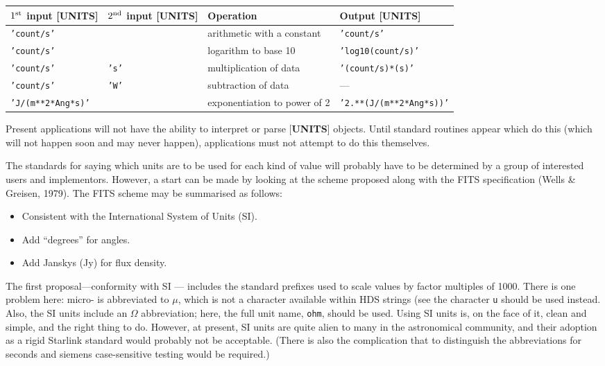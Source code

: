 \documentclass[twoside,11pt,nolof,noabs]{starlink}
\begin{document}
\smallskip
\begin{center}
\begin{tabular}{llll}
$1^{\rm st}$ input {[}\textbf{UNITS}{]} & $2^{\rm nd}$ input {[}\textbf{UNITS}{]} &
Operation & Output {[}\textbf{UNITS}{]} \\ \hline
\texttt{'count/s'} & & arithmetic with a constant & \texttt{'count/s'} \\
\texttt{'count/s'} & & logarithm to base 10 & \texttt{'log10(count/s)'} \\
\texttt{'count/s'} & \texttt{'s'} & multiplication of data & \texttt{'(count/s)*(s)'} \\
\texttt{'count/s'} & \texttt{'W'} & subtraction of data & --- \\
\texttt{'J/(m**2*Ang*s)'} & & exponentiation to power of 2 &
\texttt{'2.**(J/(m**2*Ang*s))'} \\ \hline
\end{tabular}
\end{center}
\medskip
Present applications will not have the ability to interpret or parse
{[}\textbf{UNITS}{]} objects.
Until standard routines appear
which do this (which will not happen soon and may never
happen), applications must not attempt to do this themselves.

The standards for saying which units are to be used for each kind
of value will probably have to be determined by a group of
interested users and implementors.
However, a start can be made by looking at the scheme proposed along
with the {\small FITS} specification (Wells \& Greisen, 1979).
The {\small FITS} scheme may be summarised as follows:
\begin{itemize}
\item Consistent with the International System of Units (SI).
\item Add ``degrees'' for angles.
\item Add Janskys (Jy) for flux density.
\end{itemize}

The first proposal---conformity with SI ---
includes the standard prefixes used to
scale values by factor multiples of 1000.  There is one problem here:
micro- is abbreviated to $\mu$, which is not a character available
within HDS strings (see
the character \texttt{u} should be
used instead.  Also, the SI units include an
$\Omega$ abbreviation; here, the full unit name,
\texttt{ohm}, should be used.
Using SI units is, on the face of it, clean and simple, and the right thing
to do.
However, at present, SI units are quite alien to many in the
astronomical community, and their adoption as a rigid Starlink standard
would probably not be acceptable.  (There is also the
complication that to distinguish the abbreviations for
seconds and siemens case-sensitive testing would be required.)
\end{document}
